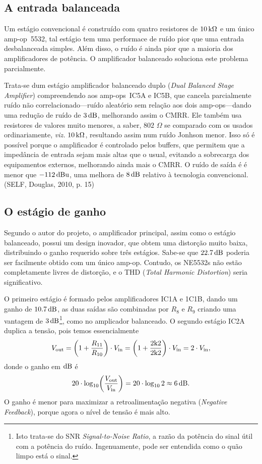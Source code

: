 \documentclass[12pt, a4paper, leqno, twoside]{book}
\def\ohm{\,\Omega}
\def\ampop{amp-op}
\def\db{{\rm dB}}
\def\[{\begin{equation}}
\def\]{\end{equation}}
\begin{document}
  

  \subsection{A entrada balanceada}
  Um est\'agio convencional \'e constru\'ido com quatro resistores de $10\,{\rm k}\Omega$ e um \'unico \ampop\ 5532, tal est\'agio tem uma performace de ru\'ido pior que uma entrada desbalanceada simples. Al\'em disso, o ru\'ido \'e ainda pior que a maioria dos amplificadores de pot\^encia. O amplificador balanceado soluciona este problema parcialmente. 

  Trata-se dum est\'agio amplificador balanceado duplo ({\it Dual Balanced Stage Amplifier}) compreendendo aos \ampop{s}\ IC5A e IC5B, que cancela parcialmente ru\'ido n\~ao correlacionado---ru\'ido aleat\'orio sem rela\c c\~ao aos dois \ampop{s}---dando uma redu\c c\~ao de ru\'ido de $3\,\db$, melhorando assim o CMRR. Ele tamb\'em usa resistores de valores muito menores, a saber, $802\,\ohm$ se comparado com os usados ordinariamente, {\it viz.} $10\,{\rm k}\Omega$, resultando assim num ru\'ido Jonhson menor. Isso s\'o \'e poss\'ivel porque o amplificador \'e controlado pelos buffers, que permitem que a imped\^ancia de entrada sejam mais altas que o usual, evitando a sobrecarga dos equipamentos externos, melhorando ainda mais o CMRR. O ru\'ido de sa\'ida \'e \'e menor que $-112\,\db{\rm u}$, uma melhora de $8\,\db$ relativo \`a tecnologia convencional. (SELF, Douglas, 2010, p. 15)
  \subsection{O est\'agio de ganho}
  Segundo o autor do projeto, o amplificador principal, assim como o est\'agio balanceado, possui um design inovador, que obtem uma distor\c c\~ao muito baixa, distribuindo o ganho requerido sobre tr\^es est\'agios. Sabe-se que $22.7\,\db$ poderia ser facilmente obtido com um \'unico \ampop. Contudo, os NE5532s n\~ao est\~ao completamente livres de distor\c c\~ao, e o THD ({\it Total Harmonic Distortion}\/) seria significativo.

  \vfill\null\eject

  O primeiro est\'agio \'e formado pelos amplificadores IC1A e 1C1B, dando um ganho de $10.7\,\db$, as duas sa\'idas s\~ao combinadas por $R_8$ e $R_9$ criando uma vantagem de $3\,\db$\footnote{Isto trata-se do SNR {\it Signal-to-Noise Ratio}, a raz\~ao da pot\^encia do sinal \'util com a pot\^encia do ru\'ido. Ingenuamente, pode ser entendida como o qu\~ao limpo est\'a o sinal.}, como no amplicador balanceado. O segundo est\'agio IC2A duplica a tens\~ao, pois temos essencialmente
  \[
    V_{\rm out}=\biggl(1+{R_{11}\over R_{10}}\biggr)\cdot V_{\rm in}=\biggl(1+{2{\rm k}2\over 2{\rm k}2}\biggr)\cdot V_{\rm in}=2\cdot V_{\rm in},
  \]
  donde o ganho em $\db$ \'e
  \[
    20\cdot\log_{10}\biggr({V_{\rm out}\over V_{\rm in}}\biggr)=20\cdot\log_{10}2\approx 6\,\db.
  \]
  O ganho \'e menor para maximizar a retroalimenta\c c\~ao negativa ({\it Negative Feedback}\/), porque agora o n\'ivel de tens\~ao \'e mais alto. 
\end{document}

